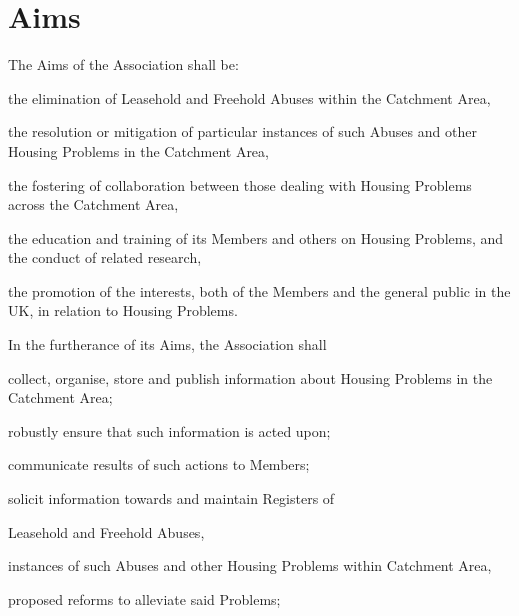 \documentclass[10pt]{mk-articles-of-association}
\newcommand{\LAFA}[0]{Leasehold and Freehold Abuses}
\begin{document}
\section{Aims}
\begin{constenum}

\item The Aims of the Association shall be:

  \begin{constenum}

  \item the elimination of \LAFA{} within the Catchment Area,

  \item the resolution or mitigation of particular instances of such
    Abuses and other Housing Problems in the Catchment Area,

  \item the fostering of collaboration between those dealing with
    Housing Problems across the Catchment Area,

  \item the education and training of its Members and others on
    Housing Problems, and the conduct of related research, \ITand

  \item the promotion of the interests, both of the Members and the
    general public in the UK, in relation to Housing Problems.

  \end{constenum}

\item In the furtherance of its Aims, the Association shall
\begin{constenum}

  \item collect, organise, store and publish information about
    Housing Problems in the Catchment Area;

  \item robustly ensure that such information is acted upon;

  \item communicate results of such actions to Members;

  \item solicit information towards and maintain Registers of
    \begin{constenum}
    \item \LAFA, \ITand
    \item instances of such Abuses and other Housing Problems within
      Catchment Area,
    \item proposed reforms to alleviate said Problems;
    \end{constenum}


\end{constenum}
\end{constenum}
\end{document}

